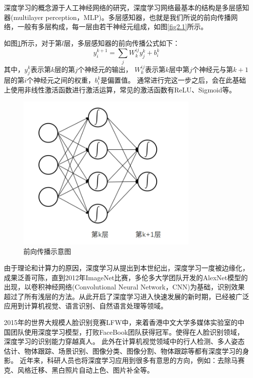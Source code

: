 深度学习的概念源于人工神经网络的研究，深度学习网络最基本的结构是多层感知器(multilayer perception，MLP)。多层感知器，也就是我们所说的前向传播网络，一般有多层构成，每一层由若干神经元组成，如图\ref{fig2.1}所示。



如图\ref{fig2.2}所示，对于第$l$层，多层感知器的前向传播公式如下：
\begin{equation}
y_{i}^{k+1} = \sum_{j}W_{k}^{ij}y_{j}^{k}+b_{i}^{k}
\end{equation}
其中，$y_{j}^{k}$表示第$k$层的第$j$个神经元的输出，
$W_{k}^{ij}$表示第$k$层中第$j$个神经元与第$k+1$层的第$i$个神经元之间的权重，$b_{i}^{k}$是偏置值。
通常进行完这一步之后，会在此基础上使用非线性激活函数进行激活运算，常见的激活函数有ReLU、Sigmoid等。

\begin{figure}[h]
\begin{center}
\includegraphics[width=0.8\textwidth]{figures/CNN01.png}
\end{center}
\vspace{-5mm}
\caption{前向传播示意图}
\label{fig2.2}
\end{figure}
由于理论和计算力的原因，深度学习从提出到本世纪出，深度学习一度被边缘化，成果泛善可陈，直到2012年ImageNet比赛，多伦多大学团队开发的AlexNet\cite{2012AlexNet}模型的出现，以卷积神经网络(Convolutional Neural Network，CNN)\cite{krizhevsky2012imagenet}为基础，识别效果超过了所有浅层的方法。从此开启了深度学习进入快速发展的新时期，已经被广泛应用到计算机视觉、语言识别、自然语言处理等领域。

2015年的世界大规模人脸识别竞赛LFW中，来着香港中文大学多媒体实验室的中国团队使用深度学习模型，打败FaceBook团队获得冠军。使得在人脸识别领域，深度学习的识别能力穿越真人。
此外在计算机视觉领域中的行人检测、多人姿态估计、物体跟踪、场景识别、图像分类、图像分割、物体跟踪等都有深度学习的身影。
近年来，科研人员也将深度学习应用到很多有意思的方向，例如：去除马赛克、风格迁移、黑白照片自动上色、图片补全等。

